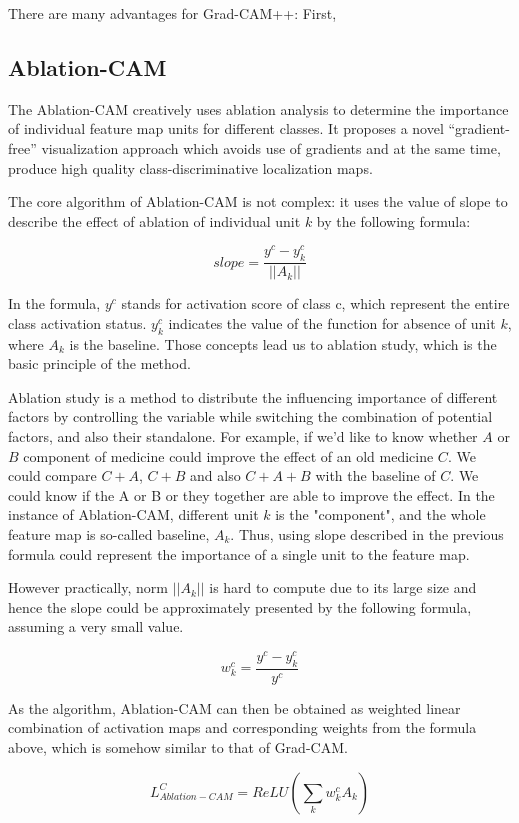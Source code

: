 \documentclass[conference]{IEEEtran}
\begin{document}
There are many advantages for Grad-CAM++: First, 
\subsection{Ablation-CAM}

The Ablation-CAM creatively uses ablation analysis to determine the importance of individual feature map units for different classes. It proposes a novel “gradient-free” visualization approach which avoids use of gradients and at the same time, produce high quality class-discriminative localization maps.\par

The core algorithm of Ablation-CAM is not complex: it uses the value of slope to describe the effect of ablation of individual unit $k$ by the following formula:

$$slope = \frac{y^c-y^c_k}{||A_k||}$$

In the formula, $y^c$ stands for activation score of class c, which represent the entire class activation status. $y^c_k$ indicates the value of the function for absence of unit $k$, where $A_k$ is the baseline. Those concepts lead us to ablation study, which is the basic principle of the method.\par
Ablation study is a method to distribute the influencing importance of different factors by controlling the variable while switching the combination of potential factors, and also their standalone. For example, if we'd like to know whether $A$ or $B$ component of medicine could improve the effect of an old medicine $C$. We could compare $C+A$, $C+B$ and also $C+A+B$ with the baseline of $C$. We could know if the A or B or they together are able to improve the effect. In the instance of Ablation-CAM, different unit $k$ is the "component", and the whole feature map is so-called baseline, $A_k$. Thus, using slope described in the previous formula could represent the importance of a single unit to the feature map.\par
However practically, norm $||A_k||$ is hard to compute due to its large size and hence the slope could be approximately presented by the following formula, assuming a very small value.

$$w^c_k = \frac{y^c-y^c_k}{y^c}$$

As the algorithm, Ablation-CAM can then be obtained as weighted linear combination of activation maps and corresponding weights from the formula above, which is somehow similar to that of Grad-CAM.

$$L^C_{Ablation-CAM}=ReLU(\sum_k {w^c_k}{A_k})$$
\end{document}
